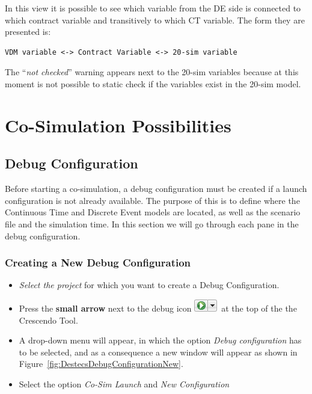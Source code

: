 \documentclass{crescendorepchap}
\begin{document}
In this view it is possible to see which variable from the DE side is
connected to which contract variable and transitively to which CT
variable. The form they are presented is:

\begin{verbatim}
VDM variable <-> Contract Variable <-> 20-sim variable
\end{verbatim}

The ``\emph{not checked}'' warning appears next to the 20-sim variables because at
this moment is not possible to static check if the variables exist in
the 20-sim model.


\chapter{Co-Simulation Possibilities}\label{chap:cosim}

\section{Debug Configuration}\label{sec:DebugConfigIntro}

Before starting a co-simulation, a debug configuration must be created
if a launch configuration is not already available.
The purpose of this is to define where the Continuous Time and Discrete
Event models are located, as well as the scenario file and the
simulation time. In this section we will go through each pane in the debug configuration.

\subsection{Creating a New Debug Configuration}

\begin{itemize}
\item
  \emph{Select the project} for which you want to create a Debug
  Configuration.
\item
  Press the \textbf{small arrow} next to the debug icon
  \includegraphics{images/DestecsDebugButtonArrow.png}~at the top of the
  the Crescendo Tool.
\item
  A drop-down menu will appear, in which the option
  \emph{Debug configuration} has to be selected, and as a consequence
a new window will appear as shown in Figure~\ref{fig:DestecsDebugConfigurationNew}.
\item
  Select the option \emph{Co-Sim Launch} and
  \emph{New Configuration}
\end{itemize}
\end{document}
